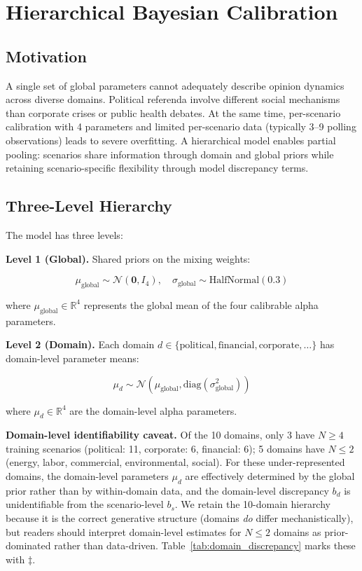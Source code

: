 \documentclass[12pt]{article}
\begin{document}
\section{Hierarchical Bayesian Calibration}
\label{sec:calibration}

\subsection{Motivation}

A single set of global parameters cannot adequately describe opinion dynamics across diverse domains. Political referenda involve different social mechanisms than corporate crises or public health debates. At the same time, per-scenario calibration with 4 parameters and limited per-scenario data (typically 3--9 polling observations) leads to severe overfitting. A hierarchical model enables partial pooling: scenarios share information through domain and global priors while retaining scenario-specific flexibility through model discrepancy terms.

\subsection{Three-Level Hierarchy}

The model has three levels:

\textbf{Level 1 (Global).} Shared priors on the mixing weights:

\begin{equation}\label{eq:13}
\mu_{\text{global}} \sim \mathcal{N}(\mathbf{0}, I_4), \quad \sigma_{\text{global}} \sim \text{HalfNormal}(0.3)
\end{equation}

where $\mu_{\text{global}} \in \mathbb{R}^4$ represents the global mean of the four calibrable alpha parameters.

\textbf{Level 2 (Domain).} Each domain $d \in \{\text{political}, \text{financial}, \text{corporate}, \ldots\}$ has domain-level parameter means:

\begin{equation}\label{eq:14}
\mu_d \sim \mathcal{N}(\mu_{\text{global}}, \text{diag}(\sigma_{\text{global}}^2))
\end{equation}

where $\mu_d \in \mathbb{R}^4$ are the domain-level alpha parameters.

\textbf{Domain-level identifiability caveat.} Of the 10 domains, only 3 have $N \geq 4$ training scenarios (political: 11, corporate: 6, financial: 6); 5 domains have $N \leq 2$ (energy, labor, commercial, environmental, social). For these under-represented domains, the domain-level parameters $\mu_d$ are effectively determined by the global prior rather than by within-domain data, and the domain-level discrepancy $b_d$ is unidentifiable from the scenario-level $b_s$. We retain the 10-domain hierarchy because it is the correct generative structure (domains \emph{do} differ mechanistically), but readers should interpret domain-level estimates for $N \leq 2$ domains as prior-dominated rather than data-driven. Table~\ref{tab:domain_discrepancy} marks these with $\ddagger$.
\end{document}
